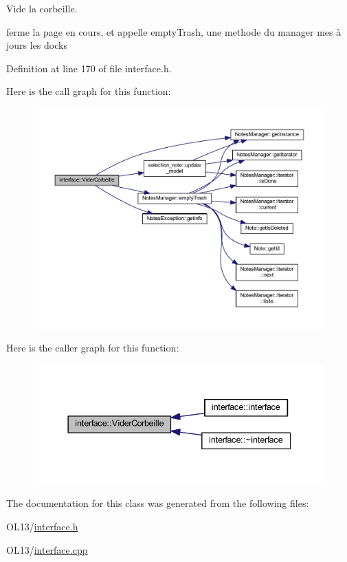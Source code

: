 Vide la corbeille. 

ferme la page en cours, et appelle empty\+Trash, une methode du manager mes à jours les docks 

Definition at line 170 of file interface.\+h.

Here is the call graph for this function\+:\nopagebreak
\begin{figure}[H]
\begin{center}
\leavevmode
\includegraphics[width=350pt]{classinterface_a430ee153cb2ea74b9103081d48cd61f3_cgraph}
\end{center}
\end{figure}
Here is the caller graph for this function\+:\nopagebreak
\begin{figure}[H]
\begin{center}
\leavevmode
\includegraphics[width=337pt]{classinterface_a430ee153cb2ea74b9103081d48cd61f3_icgraph}
\end{center}
\end{figure}


The documentation for this class was generated from the following files\+:\begin{DoxyCompactItemize}
\item 
O\+L13/\hyperlink{interface_8h}{interface.\+h}\item 
O\+L13/\hyperlink{interface_8cpp}{interface.\+cpp}\end{DoxyCompactItemize}
